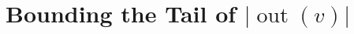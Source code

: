 \documentclass{patmorin}
\DeclareMathOperator{\outn}{out}
\begin{document}
%
%
%
%
%
%
%
%







\appendix

\section{Bounding the Tail of \texorpdfstring{\boldmath$|\outn(v)|$}{out(v)}}
\end{document}

